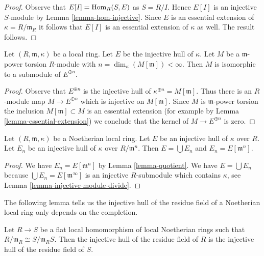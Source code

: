 \begin{proof}
Observe that $E[I] = \mathop{\mathrm{Hom}}\nolimits_R(S, E)$ as $S = R/I$. Hence $E[I]$ is an injective
$S$-module by Lemma \ref{lemma-hom-injective}. Since $E$ is an essential
extension of $\kappa = R/\mathfrak m_R$ it follows that $E[I]$ is an
essential extension of $\kappa$ as well. The result follows.
\end{proof}

\begin{lemma}
\label{lemma-torsion-submodule-sum-injective-hulls}
Let $(R, \mathfrak m, \kappa)$ be a local ring.
Let $E$ be the injective hull of $\kappa$.
Let $M$ be a $\mathfrak m$-power torsion $R$-module
with $n = \dim_\kappa(M[\mathfrak m]) < \infty$.
Then $M$ is isomorphic to a submodule of $E^{\oplus n}$.
\end{lemma}

\begin{proof}
Observe that $E^{\oplus n}$ is the injective hull of
$\kappa^{\oplus n} = M[\mathfrak m]$. Thus there is an $R$-module map
$M \to E^{\oplus n}$ which is injective on $M[\mathfrak m]$.
Since $M$ is $\mathfrak m$-power torsion the inclusion
$M[\mathfrak m] \subset M$ is an essential extension
(for example by Lemma \ref{lemma-essential-extension})
we conclude that the kernel of $M \to E^{\oplus n}$ is zero.
\end{proof}

\begin{lemma}
\label{lemma-union-artinian}
Let $(R, \mathfrak m, \kappa)$ be a Noetherian local ring.
Let $E$ be an injective hull of $\kappa$ over $R$.
Let $E_n$ be an injective hull of $\kappa$ over $R/\mathfrak m^n$.
Then $E = \bigcup E_n$ and $E_n = E[\mathfrak m^n]$.
\end{lemma}

\begin{proof}
We have $E_n = E[\mathfrak m^n]$ by Lemma \ref{lemma-quotient}.
We have $E = \bigcup E_n$ because $\bigcup E_n = E[\mathfrak m^\infty]$
is an injective $R$-submodule which contains $\kappa$, see
Lemma \ref{lemma-injective-module-divide}.
\end{proof}

\noindent
The following lemma tells us the injective hull of the residue
field of a Noetherian local ring only depends on the completion.

\begin{lemma}
\label{lemma-compare}
Let $R \to S$ be a flat local homomorphism of local Noetherian rings
such that $R/\mathfrak m_R \cong S/\mathfrak m_R S$.
Then the injective hull of the residue field
of $R$ is the injective hull of the residue field of $S$.
\end{lemma}

